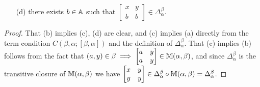 \begin{appendices}
\begin{thm}
\begin{itemize}
\item[(d)] there exists $b \in \mathbb{A}$ such that $\begin{bmatrix} x & y\\ b & b\end{bmatrix} \in \Delta_\alpha^\beta$.
\end{itemize}
\end{thm}
\begin{proof} That (b) implies (c), (d) are clear, and (c) implies (a) directly from the term condition $C(\beta,\alpha;[\beta,\alpha])$ and the definition of $\Delta_{\alpha}^{\beta}$. That (c) implies (b) follows from the fact that $(a,y) \in \beta \implies \begin{bmatrix} a & y\\ a & y\end{bmatrix} \in \mathbb{M}(\alpha,\beta)$, and since $\Delta_{\alpha}^{\beta}$ is the transitive closure of $\mathbb{M}(\alpha,\beta)$ we have $\begin{bmatrix} x & y\\ y & y\end{bmatrix} \in \Delta_{\alpha}^{\beta}\circ \mathbb{M}(\alpha,\beta) = \Delta_{\alpha}^{\beta}$.


\end{proof}
\end{appendices}
